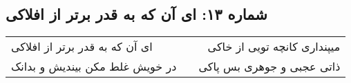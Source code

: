 \begin{center}
\section*{شماره ۱۳: ای آن که به قدر برتر از افلاکی}
\label{sec:013}
\begin{longtable}{l p{0.5cm} r}
ای آن که به قدر برتر از افلاکی
&&
میپنداری کانچه تویی از خاکی
\\
در خویش غلط مکن بیندیش و بدانک
&&
ذاتی عجبی و جوهری بس پاکی
\\
\end{longtable}
\end{center}

